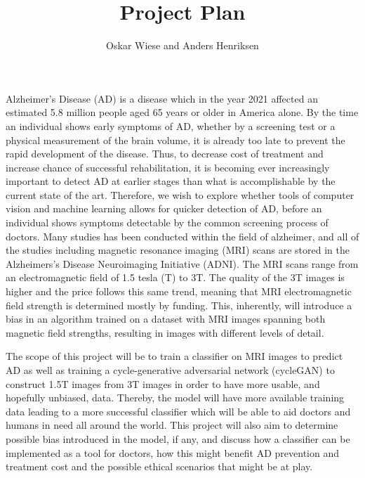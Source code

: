 \documentclass[]{article}
\title{Project Plan}
\author{Oskar Wiese and Anders Henriksen}
\begin{document}
\maketitle
\noindent
Alzheimer's Disease (AD) is a disease which in the year 2021 affected an estimated 5.8 million people aged 65 years or older in America alone.
By the time an individual shows early symptoms of AD, whether by a screening test or a physical measurement of the brain volume, it is already too late to prevent the rapid development of the disease. 
Thus, to decrease cost of treatment and increase chance of successful rehabilitation, it is becoming ever increasingly important to detect AD at earlier stages than what is accomplishable by the current state of the art.
Therefore, we wish to explore whether tools of computer vision and machine learning allows for quicker detection of AD, before an individual shows symptoms detectable by the common screening process of doctors. 
Many studies has been conducted within the field of alzheimer, and all of the studies including magnetic resonance imaging (MRI) scans are stored in the Alzheimers's Disease Neuroimaging Initiative (ADNI).
The MRI scans range from an electromagnetic field of 1.5 tesla (T) to 3T. The quality of the 3T images is higher and the price follows this same trend, meaning that MRI electromagnetic field strength is determined mostly by funding.
This, inherently, will introduce a bias in an algorithm trained on a dataset with MRI images spanning both magnetic field strengths, resulting in images with different levels of detail.

The scope of this project will be to train a classifier on MRI images to predict AD as well as training a cycle-generative adversarial network (cycleGAN) to construct 1.5T images from 3T images in order to have more usable, and hopefully unbiased, data. 
Thereby, the model will have more available training data leading to a more successful classifier which will be able to aid doctors and humans in need all around the world.
This project will also aim to determine possible bias introduced in the model, if any, and discuss how a classifier can be implemented as a tool for doctors, how this might benefit AD prevention and treatment cost and the possible ethical scenarios that might be at play. 
\end{document}
